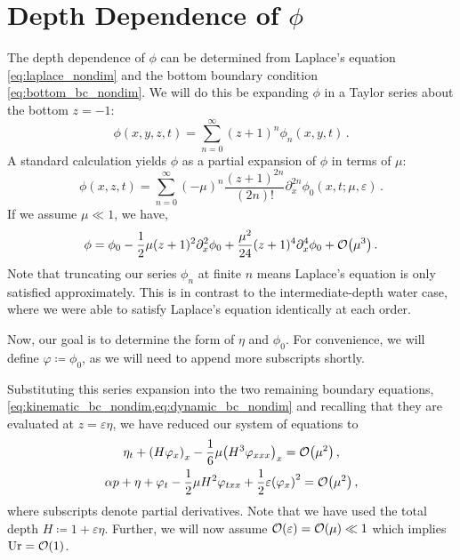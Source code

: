 \documentclass{jfm}
\DeclareMathOperator{\Ur}{Ur}
\renewcommand*{\epsilon}{\varepsilon}
\begin{document}
\section{Depth Dependence of \texorpdfstring{$\phi$}{Velocity Potential}}
The depth dependence of $\phi$ can be determined from Laplace's equation
\cref{eq:laplace_nondim} and the bottom boundary condition
\cref{eq:bottom_bc_nondim}.
We will do this be expanding $\phi$ in a Taylor series about the bottom
$z=-1$:
\begin{equation}
  \phi(x,y,z,t) = \sum_{n=0}^\infty (z+1)^n\phi_n(x,y,t) \,.
\end{equation}
A standard calculation \citep[\eg][]{mei2005nonlinear} yields $\phi$
as a partial expansion of $\phi$ in terms of $\mu$:
\begin{equation}
  \phi(x,z,t) = \sum_{n=0}^{\infty} (-\mu)^n \frac{(z+1)^{2n}}{(2n)!}
  \partial_x^{2n} \phi_0(x,t; \mu, \epsilon) \,.
  \label{eq:phi_expansion}
\end{equation}
If we assume $\mu \ll 1$, we have,
\begin{equation}
  \phi = \phi_0 - \frac{1}{2}\mu (z+1)^2\partial^2_x\phi_0 +
  \frac{\mu^2}{24}(z+1)^4\partial^4_x\phi_0 +
  \order{\mu^3} \,.
\end{equation}
Note that truncating our series $\phi_n$ at finite $n$ means
Laplace's equation is only satisfied approximately.
This is in contrast to the intermediate-depth water case, where we were
able to satisfy Laplace's equation identically at each order.

Now, our goal is to determine the form of $\eta$ and $\phi_0$.
For convenience, we will define $\varphi \coloneqq \phi_0$, as we will
need to append more subscripts shortly.

Substituting this series expansion into the two
remaining boundary equations,
\cref{eq:kinematic_bc_nondim,eq:dynamic_bc_nondim} and recalling that
they are evaluated at $z=\epsilon \eta$, we have reduced our system of
equations to
\begin{gather}
  \eta_t + \pqty{H\varphi_x}_x
    -\frac{1}{6}\mu \pqty{H^3\varphi_{xxx}}_x =
    \order{\mu^2} \label{eq:kinematic_bc_varphi} \,, \\
  \alpha p + \eta + \varphi_t - \frac{1}{2}\mu H^2\varphi_{txx} +
    \frac{1}{2}\epsilon\pqty{\varphi_x}^2 = \order{\mu^2} \,,
  \label{eq:dynamic_bc_varphi}
\end{gather}
where subscripts denote partial derivatives.
Note that we have used the total depth $H\coloneqq 1+\epsilon\eta$.
Further, we will now assume $\order{\epsilon} = \order{\mu} \ll 1$ which
implies $\Ur = \order{1}$.
\end{document}

